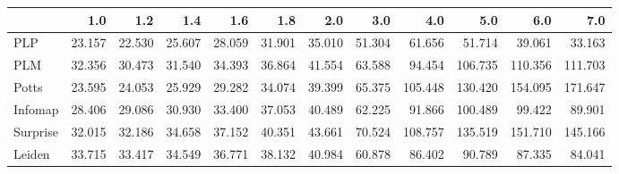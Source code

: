 \begin{tabular}{lrrrrrrrrrrr}
\toprule
{} &    1.0 &    1.2 &    1.4 &    1.6 &    1.8 &    2.0 &    3.0 &     4.0 &     5.0 &     6.0 &     7.0 \\
\midrule
PLP      & 23.157 & 22.530 & 25.607 & 28.059 & 31.901 & 35.010 & 51.304 &  61.656 &  51.714 &  39.061 &  33.163 \\
PLM      & 32.356 & 30.473 & 31.540 & 34.393 & 36.864 & 41.554 & 63.588 &  94.454 & 106.735 & 110.356 & 111.703 \\
Potts    & 23.595 & 24.053 & 25.929 & 29.282 & 34.074 & 39.399 & 65.375 & 105.448 & 130.420 & 154.095 & 171.647 \\
Infomap  & 28.406 & 29.086 & 30.930 & 33.400 & 37.053 & 40.489 & 62.225 &  91.866 & 100.489 &  99.422 &  89.901 \\
Surprise & 32.015 & 32.186 & 34.658 & 37.152 & 40.351 & 43.661 & 70.524 & 108.757 & 135.519 & 151.710 & 145.166 \\
Leiden   & 33.715 & 33.417 & 34.549 & 36.771 & 38.132 & 40.984 & 60.878 &  86.402 &  90.789 &  87.335 &  84.041 \\
\bottomrule
\end{tabular}
